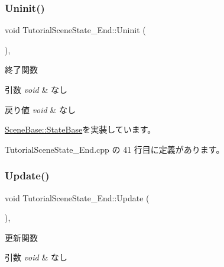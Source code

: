 \subsubsection{\texorpdfstring{Uninit()}{Uninit()}}
{\footnotesize\ttfamily void Tutorial\+Scene\+State\+\_\+\+End\+::\+Uninit (\begin{DoxyParamCaption}{ }\end{DoxyParamCaption})\hspace{0.3cm}{\ttfamily [override]}, {\ttfamily [virtual]}}



終了関数 


\begin{DoxyParams}{引数}
{\em void} & なし \\
\hline
\end{DoxyParams}

\begin{DoxyRetVals}{戻り値}
{\em void} & なし \\
\hline
\end{DoxyRetVals}


\mbox{\hyperlink{class_scene_base_1_1_state_base_a2763fa37e45b39bd8d3bbb735c76c59b}{Scene\+Base\+::\+State\+Base}}を実装しています。



 Tutorial\+Scene\+State\+\_\+\+End.\+cpp の 41 行目に定義があります。

\mbox{\label{class_tutorial_scene_state___end_a7cdf03fa9a0e41ab86c2b41b8165ad09}} 
\subsubsection{\texorpdfstring{Update()}{Update()}}
{\footnotesize\ttfamily void Tutorial\+Scene\+State\+\_\+\+End\+::\+Update (\begin{DoxyParamCaption}{ }\end{DoxyParamCaption})\hspace{0.3cm}{\ttfamily [override]}, {\ttfamily [virtual]}}



更新関数 


\begin{DoxyParams}{引数}
{\em void} & なし \\
\hline
\end{DoxyParams}

